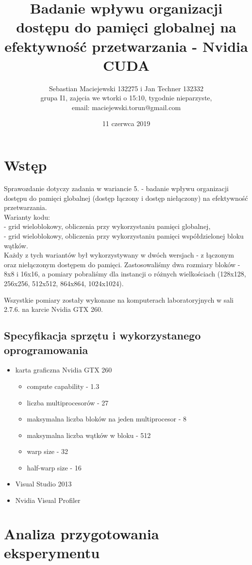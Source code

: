 \documentclass[10pt,a4paper]{article}
\author{Sebastian Maciejewski 132275 i Jan Techner 132332\\
grupa I1, zajęcia we wtorki o 15:10, tygodnie nieparzyste,\\
email: maciejewski.torun@gmail.com}
\title{Badanie wpływu organizacji dostępu do pamięci globalnej na efektywność
przetwarzania - Nvidia CUDA}
\date{11 czerwca 2019}
\begin{document}
\maketitle
\section{Wstęp}
Sprawozdanie dotyczy zadania w wariancie 5. - badanie wpływu organizacji dostępu do
pamięci globalnej (dostęp łączony i dostęp niełączony) na efektywność przetwarzania.\\
Warianty kodu:\\
- grid wieloblokowy, obliczenia przy wykorzystaniu pamięci globalnej,\\
- grid wieloblokowy, obliczenia przy wykorzystaniu pamięci współdzielonej bloku wątków.\\
Każdy z tych wariantów był wykorzystywany w dwóch wersjach - z łączonym oraz niełączonym
dostępem do pamięci. Zastosowaliśmy dwa rozmiary bloków - 8x8 i 16x16, a pomiary pobraliśmy
dla instancji o różnych wielkościach (128x128, 256x256, 512x512, 864x864, 1024x1024).

Wszystkie pomiary zostały wykonane na komputerach laboratoryjnych w sali 2.7.6. na karcie
Nvidia GTX 260.

\subsection{Specyfikacja sprzętu i wykorzystanego oprogramowania}
\begin{itemize}
	\item karta graficzna Nvidia GTX 260
	      \begin{itemize}
	      	\item compute capability - 1.3
	      	\item liczba multiprocesorów - 27
	      	\item maksymalna liczba bloków na jeden multiprocesor - 8
	      	\item maksymalna liczba wątków w bloku - 512
	      	\item warp size - 32
	      	\item half-warp size - 16
	      \end{itemize}
	\item Visual Studio 2013
	\item Nvidia Visual Profiler
\end{itemize}

\section{Analiza przygotowania eksperymentu}
\end{document}
